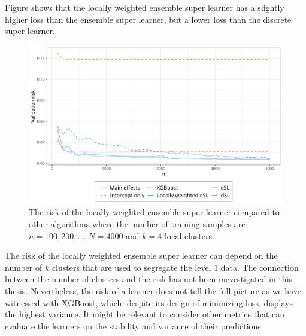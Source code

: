 \documentclass[./main.tex]{subfiles}
\begin{document}
Figure  shows that the locally weighted ensemble super learner has a slightly higher loss than the ensemble super learner, but a lower loss than the discrete super learner. 
\begin{figure}[H]
    \centering
    \includegraphics[width=\textwidth]{figures/losses_esl_lw.png}
    \caption{The risk of the locally weighted ensemble super learner compared to other algorithms where the number of training samples are $ n = 100, 200, \dots , N = 4000 $ and $ k = 4 $ local clusters.}
    \label{fig:losses_esl_lw}
\end{figure}
The risk of the locally weighted ensemble super learner can depend on the number of $ k $ clusters that are used to segregate the level 1 data. The connection between the number of clusters and the risk has not been inevestigated in this thesis. Nevertheless, the risk of a learner does not tell the full picture as we have witnessed with XGBoost, which, despite its design of minimizing loss, displays the highest variance. It might be relevant to consider other metrics that can evaluate the learners on the stability and variance of their predictions. 
\end{document}
